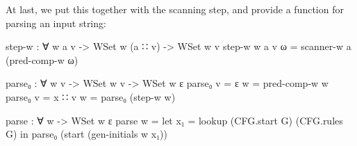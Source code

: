 		At last, we put this together with the scanning step, and provide a
		function for parsing an input string:

		\begin{code}
			step-w : ∀ {w a v} ->
			  WSet w (a ∷ v) ->
			  WSet w v
			step-w {w} {a} {v} ω = scanner-w a (pred-comp-w ω)

			parse₀ : ∀ {w v} ->
			   WSet w v ->
			   WSet w ε
			parse₀ {v = ε} w = pred-comp-w w
			parse₀ {v = x ∷ v} w = parse₀ (step-w w)

			parse : ∀ w -> WSet w ε
			parse w =
			  let x₁ = lookup (CFG.start G) (CFG.rules G) in
			  parse₀ (start (gen-initials w x₁))
		\end{code}

